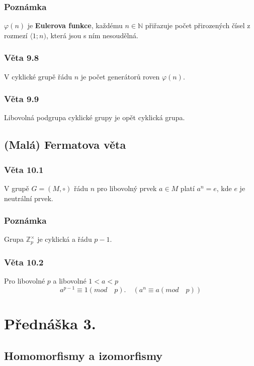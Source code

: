 \documentclass[12pt, letterpaper]{article}
\begin{document}
\subsubsection*{Poznámka}
$\varphi(n)$ je \textbf{Eulerova funkce},
 každému $n \in \mathbb{N}$ přiřazuje počet přirozených čísel z rozmezí $\langle 1;n)$, která jsou s ním nesoudělná.

\subsubsection*{Věta 9.8}
V cyklické grupě řádu $n$ je počet generátorů roven $\varphi(n)$.

\subsubsection*{Věta 9.9}
Libovolná podgrupa cyklické grupy je opět cyklická grupa.

\subsection{(Malá) Fermatova věta}

\subsubsection*{Věta 10.1}
V grupě $G = (M, \circ)$ řádu $n$ pro libovolný prvek $a \in M$ platí
$a^n = e$, kde $e$ je neutrální prvek. 

\subsubsection*{Poznámka}
Grupa $ \mathbb{Z}^{\times}_{p}$ je cyklická a řádu $p - 1$.

\subsubsection*{Věta 10.2}
Pro libovolné $p$ a libovolné $1 < a < p$
\[a^{p-1} \equiv 1 (mod \quad p). \quad (a^n \equiv a (mod \quad p))\] 

\section{Přednáška 3.}

\subsection{Homomorfismy a izomorfismy}
\end{document}
